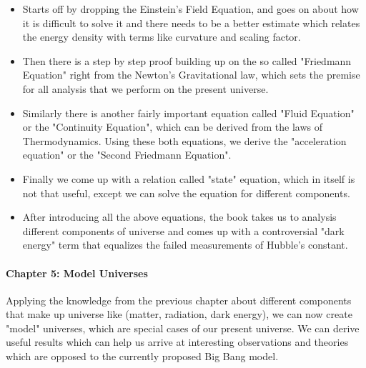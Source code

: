 \documentclass[11pt]{article}
\begin{document}
\begin{itemize}
	\item Starts off by dropping the Einstein's Field Equation, and goes on about how it
is difficult to solve it and there needs to be a better estimate which relates
the energy density with terms like curvature and scaling factor.
\item Then there is a
step by step proof building up on the so called "Friedmann Equation" right from
the Newton's Gravitational law, which sets
the premise for all analysis that we perform on the present universe.
\item Similarly there is another fairly important equation called "Fluid Equation" or
the "Continuity Equation", which can be derived from the laws of Thermodynamics.
Using these both equations, we derive the "acceleration equation" or the "Second
Friedmann Equation".
\item Finally we come up with a relation called "state" equation, which in itself is
not that useful, except we can solve the equation for different components.
\item After introducing all the above equations, the book takes us to analysis
different components of universe and comes up with a controversial "dark energy"
term that equalizes the failed measurements of Hubble's constant.
\end{itemize}

\paragraph{Chapter 5: Model Universes}

Applying the knowledge from the previous chapter about different components
that make up universe like (matter, radiation, dark energy), we can now create
"model" universes, which are special cases of our present universe. We can
derive useful results which can help us arrive at interesting observations and
theories which are opposed to the currently proposed Big Bang model.
\end{document}
